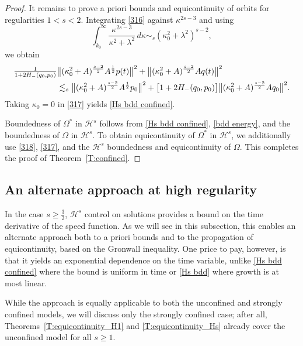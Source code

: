 \documentclass{amsart}
\theoremstyle{definition}
\numberwithin{equation}{section}
\renewcommand{\H}{\mathcal H}
\begin{document}
\begin{proof}
It remains to prove a priori bounds and equicontinuity of orbits for regularities $1<s<2$.  Integrating \eqref{316} against $\kappa^{2s-3}$ and using 
\begin{equation*}
\int_{k_0}^{\infty} \frac{\kappa^{2s-3}}{\kappa^2 + \lambda^2} \,d\kappa\sim_{s} (\kappa_0^2+\lambda^2)^{s-2},
\end{equation*}
we obtain
\begin{align}\label{317}
\tfrac{1}{1 + 2H_-(q_0,p_0)}&\bigl\|(\kappa_0^2+A)^{\frac{s-2}2}A^\frac12p(t)\bigr\|^2+\bigl\|(\kappa_0^2+A)^{\frac{s-2}2}A q(t)\bigr\|^2\notag\\
&\lesssim_s \bigl\|(\kappa_0^2+A)^{\frac{s-2}2}A^\frac12p_0\bigr\|^2+\bigl[1+ 2H_-(q_0,p_0)\bigr]\bigl\|(\kappa_0^2+A)^{\frac{s-2}2}Aq_0\bigr\|^2.
\end{align}
Taking $\kappa_0=0$ in \eqref{317} yields \eqref{Hs bdd confined}.

Boundedness of $\Omega^*$ in $\H^s$ follows from \eqref{Hs bdd confined}, \eqref{bdd energy}, and the boundedness of $\Omega$ in $\H^s$. To obtain equicontinuity of $\Omega^*$ in $\H^s$, we additionally use \eqref{318}, \eqref{317}, and the $\H^s$ boundedness and equicontinuity of $\Omega$. This completes the proof of Theorem~\ref{T:confined}.
\end{proof}


\subsection{An alternate approach at high regularity}\label{SS:4.2}


In the case $s\geq\frac32$, $\H^s$ control on solutions provides a bound on the time derivative of the speed function. As we will see in this subsection, this enables an alternate approach both to a priori bounds and to the propagation of equicontinuity, based on the Gronwall inequality.  One price to pay, however, is that it yields an exponential dependence on the time variable, unlike \eqref{Hs bdd confined} where the bound is uniform in time or \eqref{Hs bdd} where growth is at most linear.

While the approach is equally applicable to both the unconfined and strongly confined models, we will discuss only the strongly confined case; after all, Theorems~\ref{T:equicontinuity_H1} and \ref{T:equicontinuity_Hs} already cover the unconfined model for all $s\geq 1$.  
\end{document}

